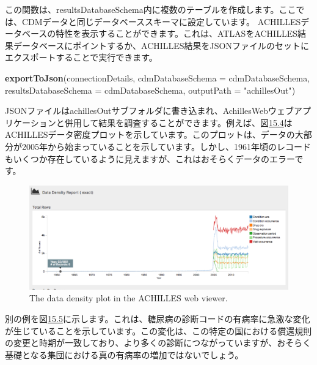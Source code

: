 \documentclass[
  11pt]{book}
\newenvironment{Shaded}{\begin{snugshade}}{\end{snugshade}}
\newcommand{\AttributeTok}[1]{\textcolor[rgb]{0.13,0.29,0.53}{#1}}
\newcommand{\FunctionTok}[1]{\textcolor[rgb]{0.13,0.29,0.53}{\textbf{#1}}}
\newcommand{\NormalTok}[1]{#1}
\newcommand{\StringTok}[1]{\textcolor[rgb]{0.31,0.60,0.02}{#1}}
\theoremstyle{definition}
\theoremstyle{definition}
\theoremstyle{definition}
\theoremstyle{definition}
\theoremstyle{remark}
\begin{document}
この関数は、resultsDatabaseSchema内に複数のテーブルを作成します。ここでは、CDMデータと同じデータベーススキーマに設定しています。 ACHILLESデータベースの特性を表示することができます。これは、ATLASをACHILLES結果データベースにポイントするか、ACHILLES結果をJSONファイルのセットにエクスポートすることで実行できます。

\begin{Shaded}
\begin{Highlighting}[]
\FunctionTok{exportToJson}\NormalTok{(connectionDetails,}
             \AttributeTok{cdmDatabaseSchema =}\NormalTok{ cdmDatabaseSchema,}
             \AttributeTok{resultsDatabaseSchema =}\NormalTok{ cdmDatabaseSchema,}
             \AttributeTok{outputPath =} \StringTok{"achillesOut"}\NormalTok{)}
\end{Highlighting}
\end{Shaded}

JSONファイルはachillesOutサブフォルダに書き込まれ、AchillesWebウェブアプリケーションと併用して結果を調査することができます。例えば、図\href{https://ohdsi.github.io/TheBookOfOhdsi/DataQuality.html\#fig:achillesDataDensity}{15.4}はACHILLESデータ密度プロットを示しています。このプロットは、データの大部分が2005年から始まっていることを示しています。しかし、1961年頃のレコードもいくつか存在しているように見えますが、これはおそらくデータのエラーです。

\begin{figure}

{\centering \includegraphics[width=1\linewidth]{images/DataQuality/achillesDataDensity} 

}

\caption{The data density plot in the ACHILLES web viewer.}\label{fig:achillesDataDensity}
\end{figure}

別の例を図\href{https://ohdsi.github.io/TheBookOfOhdsi/DataQuality.html\#fig:achillesCodeChange}{15.5}に示します。これは、糖尿病の診断コードの有病率に急激な変化が生じていることを示しています。この変化は、この特定の国における償還規則の変更と時期が一致しており、より多くの診断につながっていますが、おそらく基礎となる集団における真の有病率の増加ではないでしょう。
\end{document}

